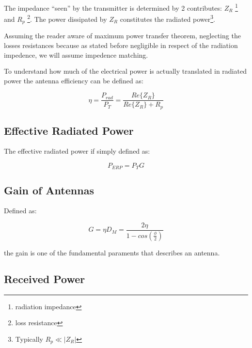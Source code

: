 The impedance “seen” by the transmitter is determined by 2 contributes: $Z_R$ \footnote{radiation impedance} and $R_p$ \footnote{loss resistance}. The power dissipated by $Z_R$ constitutes the radiated power\footnote{Typically $R_p \ll |Z_R|$}.

Assuming the reader aware of maximum power transfer theorem, neglecting the losses resistances because as stated before negligible in respect of the radiation impedence, we will assume impedence matching.

To understand how much of the electrical power is actually translated in radiated power the antenna efficiency can be defined as:

\begin{equation}
  	\eta = \frac{P_{rad}}{P_T}= \frac{Re\{ Z_R \}}{Re\{ Z_R \}+R_p}
  \end{equation}  


\subsection{Effective Radiated Power} %
\label{sub:effective_radiated_power}

The effective radiated power if simply defined as:

\begin{equation}
	P_{ERP} = P_TG 
\end{equation}


\subsection{Gain of Antennas} %
\label{sub:gain_of_antenna}

Defined as:

\begin{equation}
	G = \eta D_M=\frac{2\eta}{1-cos(\frac{\phi}{2})}
\end{equation}

the gain is one of the fundamental paraments that describes an antenna.


\subsection{Received Power} %
\label{sub:received_power}


